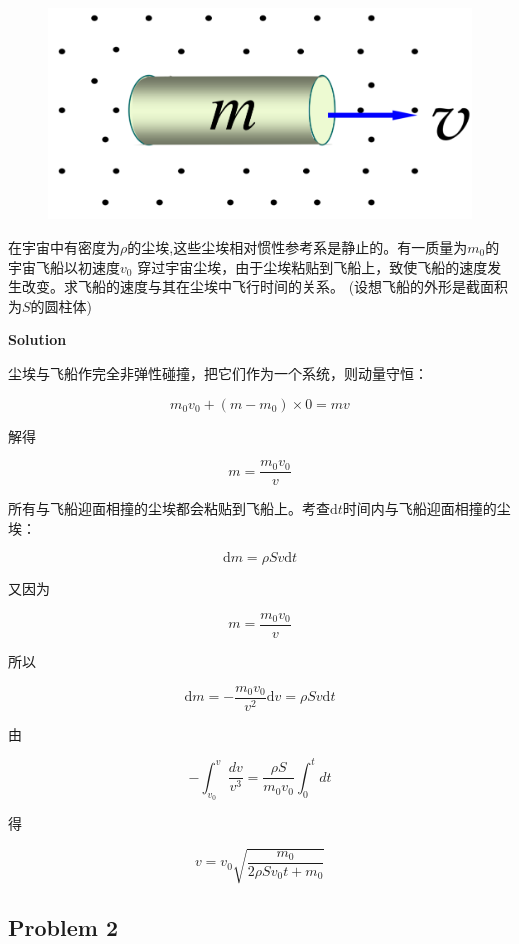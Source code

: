 \documentclass[
	12pt, %
	a4paper, %
]{myLegrandOrangeBook}
\newcommand{\rmd}{\mathrm{d}}
\begin{document}
\begin{figure}
    \centering
    \includegraphics[scale=0.12]{"Chapter 03 images/pic7.png"}
    \label{pic7}
\end{figure}

在宇宙中有密度为\(\rho\)的尘埃,这些尘埃相对惯性参考系是静止的。有一质量为\(m_0\)的宇宙飞船以初速度\(v_0\)
穿过宇宙尘埃，由于尘埃粘贴到飞船上，致使飞船的速度发生改变。求飞船的速度与其在尘埃中飞行时间的关系。
(设想飞船的外形是截面积为\(S\)的圆柱体)
\vspace{1em}

\textbf{Solution}
\vspace{1em}

尘埃与飞船作完全非弹性碰撞，把它们作为一个系统，则动量守恒：

$$
    m_0 v_0+\left(m-m_0\right) \times 0=m v
$$

解得

\[
    m = \frac{m_0v_0}{v}
\]

所有与飞船迎面相撞的尘埃都会粘贴到飞船上。考查\(\rmd t\)时间内与飞船迎面相撞的尘埃：

\[
    \rmd m = \rho Sv\rmd t
\]

又因为

\[
    m = \frac{m_0v_0}{v}
\]

所以

\[
    \rmd m = -\frac{m_0v_0}{v^2} \rmd v = \rho Sv\rmd t
\]

由

$$
    -\int_{v_0}^v \frac{d v}{v^3}=\frac{\rho S}{m_0 v_0} \int_0^t d t
$$

得

$$
    v=v_0\sqrt{\frac{m_0}{2 \rho S v_0 t+m_0}}
$$

\subsection{Problem 2}
\end{document}
